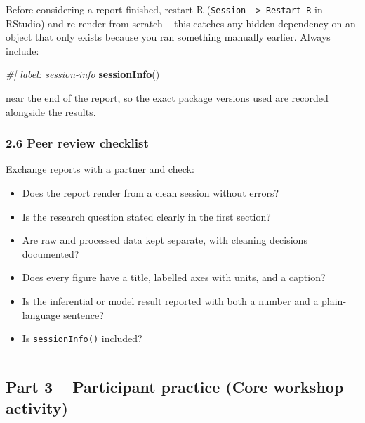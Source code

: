\documentclass[11pt]{article}
\newenvironment{Shaded}{\begin{snugshade}}{\end{snugshade}}
\newcommand{\CommentTok}[1]{\textcolor[rgb]{0.56,0.35,0.01}{\textit{#1}}}
\newcommand{\FunctionTok}[1]{\textcolor[rgb]{0.13,0.29,0.53}{\textbf{#1}}}
\newcommand{\NormalTok}[1]{#1}
\providecommand{\tightlist}{%
  \setlength{\itemsep}{0pt}\setlength{\parskip}{0pt}}
\begin{document}
Before considering a report finished, restart R
(\texttt{Session\ -\textgreater{}\ Restart\ R} in RStudio) and re-render
from scratch -- this catches any hidden dependency on an object that
only exists because you ran something manually earlier. Always include:

\begin{Shaded}
\begin{Highlighting}[]
\CommentTok{\#| label: session{-}info}
\FunctionTok{sessionInfo}\NormalTok{()}
\end{Highlighting}
\end{Shaded}

near the end of the report, so the exact package versions used are
recorded alongside the results.

\hypertarget{peer-review-checklist}{%
\subsubsection{2.6 Peer review checklist}\label{peer-review-checklist}}

Exchange reports with a partner and check:

\begin{itemize}
\tightlist
\item[$\square$]
  Does the report render from a clean session without errors?
\item[$\square$]
  Is the research question stated clearly in the first section?
\item[$\square$]
  Are raw and processed data kept separate, with cleaning decisions
  documented?
\item[$\square$]
  Does every figure have a title, labelled axes with units, and a
  caption?
\item[$\square$]
  Is the inferential or model result reported with both a number and a
  plain-language sentence?
\item[$\square$]
  Is \texttt{sessionInfo()} included?
\end{itemize}

\begin{center}\rule{0.5\linewidth}{0.5pt}\end{center}

\hypertarget{part-3-participant-practice-core-workshop-activity}{%
\subsection{Part 3 -- Participant practice (Core workshop
activity)}\label{part-3-participant-practice-core-workshop-activity}}
\end{document}
